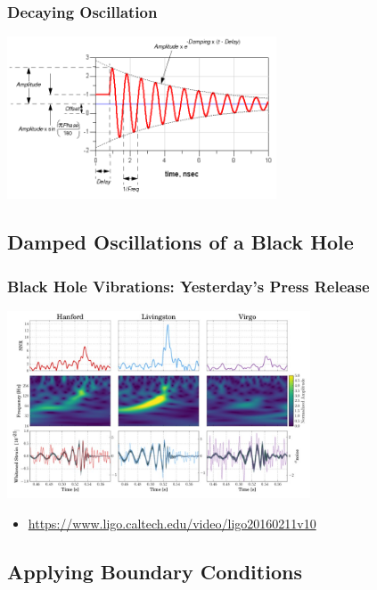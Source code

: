 \documentclass[pdf,hideothersubsections]{beamer}
\begin{document}
\begin{frame}
\frametitle{Decaying Oscillation}

\centering
\includegraphics[width=8cm]{damped_sine.png}

\end{frame}


\subsection{Damped Oscillations of a Black Hole}
\begin{frame}
\frametitle{Black Hole Vibrations: Yesterday's Press Release}
\centering
\includegraphics[width=9cm]{GW170814-TF.jpg}

\begin{itemize}
   \item \url{https://www.ligo.caltech.edu/video/ligo20160211v10}
\end{itemize}
\end{frame}


\subsection{Applying Boundary Conditions}

\end{document}

